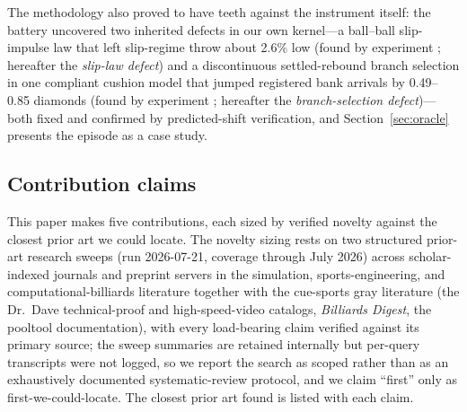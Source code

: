 The methodology also proved to have teeth against the instrument itself:
the battery uncovered two inherited defects in our own kernel---a
ball--ball slip-impulse law that left slip-regime throw about 2.6\% low
(found by experiment ; hereafter the \emph{slip-law defect}) and a
discontinuous settled-rebound branch selection in one
compliant cushion model that jumped registered bank arrivals by
0.49--0.85 diamonds (found by experiment ; hereafter the
\emph{branch-selection defect})---both fixed and
confirmed by predicted-shift verification, and
Section~\ref{sec:oracle} presents the episode as a case study.

\subsection{Contribution claims}
\label{sec:contributions}

This paper makes five contributions, each sized by verified novelty
against the closest prior art we could locate. The novelty sizing rests
on two structured prior-art research sweeps (run 2026-07-21, coverage
through July 2026) across scholar-indexed journals and preprint servers
in the simulation, sports-engineering, and computational-billiards
literature together with the cue-sports gray literature (the Dr.~Dave
technical-proof and high-speed-video catalogs, \emph{Billiards Digest},
the pooltool documentation), with every load-bearing claim verified
against its primary source; the sweep summaries are retained internally
but per-query transcripts were not logged, so we report the search as
scoped rather than as an exhaustively documented systematic-review
protocol, and we claim ``first'' only as first-we-could-locate. The
closest prior art found is listed with each claim.


